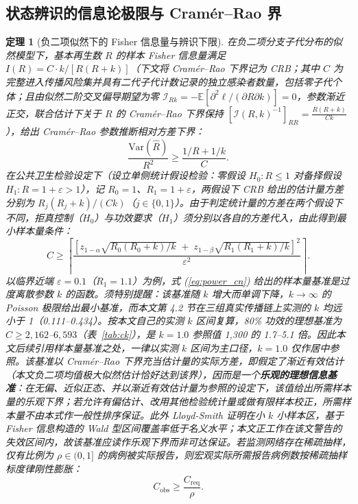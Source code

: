 \documentclass[10pt,a4paper]{article}
\theoremstyle{plain}
\newtheorem{theorem}{定理}
\theoremstyle{definition}
\begin{document}
\subsection{状态辨识的信息论极限与 Cramér--Rao 界}

\begin{theorem}[负二项似然下的 Fisher 信息量与辨识下限]\label{thm:fisher}
在负二项分支子代分布的似然模型下，基本再生数 $R$ 的样本 Fisher 信息量满足 $I(R) = C \cdot k / [R(R+k)]$（下文将 Cramér--Rao 下界记为 CRB；其中 $C$ 为完整进入传播风险集并具有二代子代计数记录的独立感染者数量，包括零子代个体；且由似然二阶交叉偏导期望为零 $\mathcal{I}_{Rk} = -\mathbb{E}[\partial^2 \ell / (\partial R \partial k)] = 0$，参数渐近正交，联合估计下关于 $R$ 的 Cramér--Rao 下界保持 $[\mathcal{I}(R,k)^{-1}]_{RR} = \frac{R(R+k)}{Ck}$），给出 Cramér--Rao 参数推断相对方差下界：
\begin{equation}
\frac{\text{Var}(\hat{R})}{R^2} \ge \frac{1/R + 1/k}{C}.
\label{eq:cramer_cn}
\end{equation}
在公共卫生检验设定下（设立单侧统计假设检验：零假设 $H_0: R \le 1$ 对备择假设 $H_1: R = 1 + \varepsilon > 1$），记 $R_0 = 1$、$R_1 = 1 + \varepsilon$，两假设下 CRB 给出的估计量方差分别为 $R_j(R_j+k)/(Ck)$（$j \in \{0,1\}$）。由于判定统计量的方差在两个假设下不同，拒真控制（$H_0$）与功效要求（$H_1$）须分别以各自的方差代入，由此得到最小样本量条件：
\begin{equation}
C \ge \left\lceil \frac{\left[z_{1-\alpha}\sqrt{R_0(R_0+k)/k} \;+\; z_{1-\beta}\sqrt{R_1(R_1+k)/k}\right]^2}{\varepsilon^2} \right\rceil .
\label{eq:power_cn}
\end{equation}
以临界近端 $\varepsilon = 0.1$（$R_1 = 1.1$）为例，式 (\ref{eq:power_cn}) 给出的样本量基准是过度离散参数 $k$ 的函数。须特别提醒：该基准随 $k$ 增大而单调下降，$k \to \infty$ 的 Poisson 极限给出最小基准，而本文第 4.2 节在三组真实传播链上实测的 $k$ 均远小于 1（0.111--0.434）。按本文自己的实测 $k$ 区间复算，80\% 功效的理想基准为 $C \ge 2{,}162$--$6{,}593$（表~\ref{tab:ck}），是 $k = 1.0$ 参照值 1,300 的 1.7--5.1 倍。因此本文后续引用样本量基准之处，一律以实测 $k$ 区间为主口径，$k=1.0$ 仅作居中参照。该基准以 Cramér--Rao 下界充当估计量的实际方差，即假定了渐近有效估计（本文负二项均值极大似然估计恰好达到该界），因而是一个\textbf{乐观的理想信息基准}：在无偏、近似正态、并以渐近有效估计量为参照的设定下，该值给出所需样本量的乐观下界；若允许有偏估计、改用其他检验统计量或做有限样本校正，所需样本量不由本式作一般性排序保证。此外 Lloyd-Smith\citep{lloyd-smith2007fisher} 证明在小 $k$ 小样本区，基于 Fisher 信息构造的 Wald 型区间覆盖率低于名义水平；本文正工作在该文警告的失效区间内，故该基准应读作乐观下界而非可达保证。若监测网络存在稀疏抽样，仅有比例为 $\rho \in (0, 1]$ 的病例被实际报告，则宏观实际所需报告病例数按稀疏抽样标度律刚性膨胀：
\begin{equation}
C_{\text{obs}} \ge \frac{C_{\text{req}}}{\rho}.
\label{eq:sparse_sampling}
\end{equation}
\end{theorem}
\end{document}
